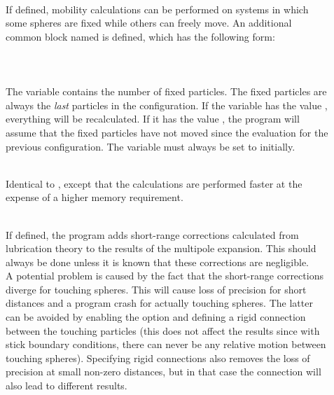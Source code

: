 \begin{description}
\item[]
\\
If defined, mobility calculations can be performed on systems
in which some spheres are fixed while others can freely move.
An additional common block named  is defined,
which has the following form:\\
\wsp{}\\
\wsp{}\\
\wsp{}\\
The variable  contains the number of fixed particles.
The fixed particles are always the {\em last} 
particles in the configuration. If the variable  has
the value , everything will be recalculated.
If it has the value , the program will assume that
the fixed particles have not moved since the evaluation for the
previous configuration. The variable  must always be
set to  initially.

\item[]
\\
Identical to , except that the calculations are
performed faster at the expense of a higher memory requirement.

\item[]
\\
If defined, the program adds short-range corrections calculated from
lubrication theory to the results of the multipole
expansion. This should always be done unless it is known that these
corrections are negligible.\\
A potential problem is caused by the fact that the short-range
corrections diverge for touching spheres. This will cause loss of
precision for short distances and a program crash for actually
touching spheres. The latter can be avoided by enabling the option
 and defining a rigid connection between the touching
particles (this does not affect the results since with stick
boundary conditions, there can never be any relative motion between
touching spheres). Specifying rigid connections also removes the
loss of precision at small non-zero distances, but in that case the
connection will also lead to different results.


\end{description}
